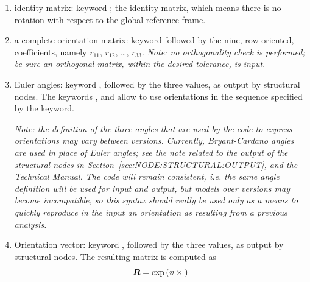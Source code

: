 \begin{enumerate}
\item identity matrix: keyword ; the identity matrix,
which means there is no rotation with respect to the global reference
frame.

\item a complete orientation matrix: keyword 
followed by the nine, row-oriented, coefficients, namely
$ r_{11} $, $ r_{12} $, \ldots, $ r_{33} $.
\emph{Note: no orthogonality check is performed; be sure an orthogonal
matrix, within the desired tolerance, is input}.

\item Euler angles: keyword , followed by the three
values, as output by structural nodes.
The keywords ,  and 
allow to use orientations in the sequence specified by the keyword.


\emph{Note: the definition of the three angles that are used 
by the code to express orientations may vary between versions.
Currently, Bryant-Cardano angles are used in place of Euler
angles; see the note related to the output of the structural nodes
in Section~\ref{sec:NODE:STRUCTURAL:OUTPUT}, and the Technical Manual.
The code will remain consistent, i.e. the same angle
definition will be used for input and output, but models
over versions may become incompatible, so this syntax should 
really be used only as a means to quickly reproduce in the input
an orientation as resulting from a previous analysis.}

\item Orientation vector: keyword , followed by the three
values, as output by structural nodes.
The resulting matrix is computed as
\begin{equation}
	\boldsymbol{R} = \exp\left( \boldsymbol{v}\times{} \right)
\end{equation}
\end{enumerate}

